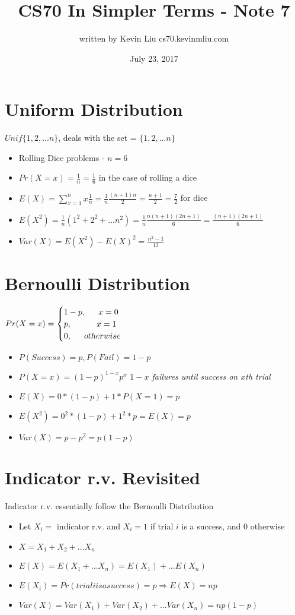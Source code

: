 \documentclass[a4paper]{article}
\title{CS70 In Simpler Terms - Note 7}
\author{written by Kevin Liu cs70.kevinmliu.com}
\date{July 23, 2017}
\begin{document}
\maketitle

\section{Uniform Distribution}
$Unif\{1,2,...n\}$, deals with the set = $\{1,2, ... n\}$
\begin{itemize}
    \item Rolling Dice problems - $n = 6$
    \item $Pr(X=x) = \frac{1}{n} = \frac{1}{6}$ in the case of rolling a dice
    \item $E(X) = \sum_{x=1}^n x\frac{1}{n} = \frac{1}{n}\frac{(n+1)n}{2} =\frac{n+1}{2} = \frac{7}{2}$ for dice
    \item $E(X^2) = \frac{1}{n}(1^2 + 2^2 + ... n^2) = \frac{1}{n}\frac{n(n+1)(2n+1)}{6} =\frac{(n+1)(2n+1)}{6}$
    \item $Var(X) = E(X^2) - E(X)^2 = \frac{n^2 -1}{12}$
\end{itemize}

\section{Bernoulli Distribution}
$Pr(X=x) =
\begin{cases}
1-p,\indent x=0\\
p, \indent\indent x = 1\\
0,\indent otherwise
\end{cases}$
\begin{itemize}
    \item $P(Success) = p, P(Fail) = 1-p$ 
    \item $P(X=x) = (1-p)^{1-x}p^x$ \textit{$1-x$ failures until success on $x$th trial}
    \item $E(X) = 0 * (1-p) + 1*P(X=1) = p$
    \item $E(X^2) = 0^2 * (1-p) + 1^2*p = E(X) = p$
    \item $Var(X) = p - p^2 = p(1-p)$
\end{itemize}

\section{Indicator r.v. Revisited}
Indicator r.v. essentially follow the Bernoulli Distribution
\begin{itemize}
    \item Let $X_i = $ indicator r.v. and $X_i = 1$ if trial $i$ is a success, and $0$ otherwise
    \item $X = X_1 + X_2 + ... X_n$
    \item $E(X) = E(X_1 + ... X_n) = E(X_1) + ... E(X_n)$
    \item $E(X_i) = Pr(trial i is a success) = p \Rightarrow E(X) = np$
    \item $Var(X) = Var(X_1) + Var(X_2) +... Var(X_n) = np(1-p)$
\end{itemize}
\end{document}
